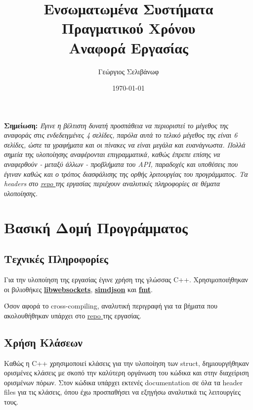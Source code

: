 \documentclass[12pt]{article}
\title{%
  Ενσωματωμένα Συστήματα Πραγματικού Χρόνου \\
  \large Αναφορά Εργασίας}
\author{Γεώργιος Σελιβάνωφ}
\date{\today}
\newcommand{\repo}{\href{https://github.com/Selivanof/university-collection/tree/main/RealTime_Embedded_Systems}{repo }}
\begin{document}
\maketitle
\thispagestyle{empty}
\newpage


\tableofcontents
\begin{center}
    \textbf{Σημείωση:}
    \textit{Έγινε η βέλτιστη δυνατή προσπάθεια να περιοριστεί το μέγεθος της αναφοράς στις ενδεδειγμένες 4 σελίδες, παρόλα αυτά το τελικό μέγεθος της είναι 6 σελίδες, ώστε τα γραφήματα και οι πίνακες να είναι μεγάλα και ευανάγνωστα. Πολλά σημεία της υλοποίησης αναφέρονται επιγραμματικά, καθώς έπρεπε επίσης να αναφερθούν - μεταξύ άλλων - προβλήματα του API, παραδοχές και υποθέσεις που έγιναν καθώς και ο τρόπος διασφάλισης της ορθής λριτουργίας του προγράμματος. Τα headers στο \repo της εργασίας περιέχουν αναλυτικές πληροφορίες σε θέματα υλοποίησης.}
\end{center}
\thispagestyle{empty}
\newpage
\setcounter{page}{1}
\section{Βασική Δομή Προγράμματος}
\subsection{Τεχνικές Πληροφορίες}
Για την υλοποίηση της εργασίας έγινε χρήση της γλώσσας C++. Χρησιμοποιήθηκαν οι βιλιοθήκες \href{https://libwebsockets.org/}{\textbf{libwebsockets}}, \href{https://simdjson.org/}{\textbf{simdjson}} και \href{https://fmt.dev/}{\textbf{fmt}}.

Όσον αφορά το cross-compiling, αναλυτική περιγραφή για τα βήματα που ακολουθήθηκαν υπάρχει στο \repo της εργασίας.

\subsection{Χρήση Κλάσεων}
Καθώς η C++ χρησιμοποιεί κλάσεις για την υλοποίηση των struct, δημιουργήθηκαν ορισμένες κλάσεις με σκοπό την καλύτερη οργάνωση του κώδικα και στην διαχείριση ορισμένων πόρων.
Στον κώδικα υπάρχει εκτενές documentation σε όλα τα header files για τις κλάσεις, όπου έχω προσπαθήσει να εξηγήσω αναλυτικά τις λειτουργίες τους.
\end{document}
